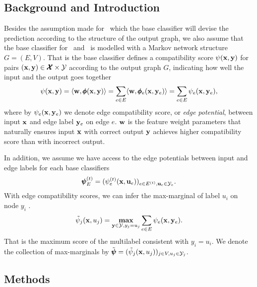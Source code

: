 {\subsection{Background and Introduction}

Besides the assumption made for \mve\ which the base classifier will devise the prediction according to the structure of the output graph, we also assume that the base classifier for \amm\ and \mam\ is modelled with a Markov network structure $G=(E,V)$.
That is the base classifier defines a compatibility score $\psi(\mathbf {x},\mathbf {y})$ for pairs $(\mathbf {x},\mathbf {y})\in\pmb {\mathcal{X}}\times\mathcal{Y}$ according to the output graph $G$, indicating how well the input and the output goes together
\begin{align*}
	\psi(\mathbf {x},\mathbf {y}) = \langle \mathbf {w}, \pmb \phi(\mathbf {x},\mathbf {y}) \rangle = \sum_{e\in E}\langle \mathbf {w}, \pmb \phi_e(\mathbf {x},\mathbf {y}_e) \rangle=\sum_{e\in E}\psi_e(\mathbf {x},\mathbf {y}_e),
\end{align*}
where by $\psi_e(\mathbf {x},\mathbf {y}_e)$ we denote edge compatibility score, or \textit{edge potential}, between input $\mathbf {x}$ and edge label $\mathbf {y}_e$ on edge $e$.
$\mathbf {w}$ is the feature weight parameters that naturally ensures input $\mathbf {x}$ with correct output $\mathbf {y}$ achieves higher compatibility score than with incorrect output.

In addition, we assume we have access to the edge potentials between input and edge labels for each base classifiers
\begin{align*}
	\pmb \psi_E^{(t)} = (\psi_e^{(t)}(\mathbf {x},\mathbf {u}_e))_{e\in E^{(t)},\mathbf {u}_e\in\mathcal{Y}_e}.
\end{align*}
With edge compatibility scores, we can infer the max-marginal of label $u_i$ on node $y_i$ \citep{Wainwright05map}.
\begin{align*}
	\tilde{\psi}_j(\mathbf {x},u_j) = \underset{\mathbf {y}\in\mathcal{Y},y_j=u_j}{\textbf{max}}\sum_{e\in E}\psi_e(\mathbf {x},\mathbf {y}_e).
\end{align*}
That is the maximum score of the multilabel consistent with $y_i=u_i$.
We denote the collection of max-marginals by $\tilde{\pmb \psi} = (\tilde{\psi}_j(\mathbf {x},u_j))_{j\in V,u_j\in\mathcal{Y}_j}$.

\subsection{Methods}

}
